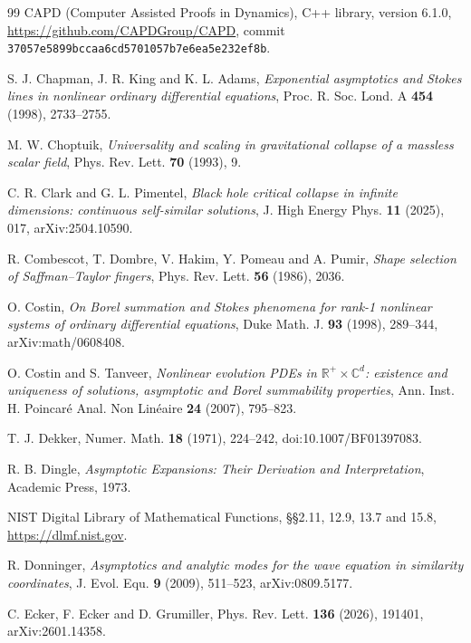 \documentclass{amsart}
\numberwithin{equation}{section}
\theoremstyle{plain}
\theoremstyle{definition}
\theoremstyle{remark}
\begin{document}
\begin{thebibliography}{99}
 CAPD (Computer Assisted Proofs in Dynamics), C++ library, version 6.1.0,
\url{https://github.com/CAPDGroup/CAPD}, commit \texttt{37057e5899bccaa6cd5701057b7e6ea5e232ef8b}.

 S. J. Chapman, J. R. King and K. L. Adams, \emph{Exponential asymptotics and Stokes
lines in nonlinear ordinary differential equations}, Proc. R. Soc. Lond. A \textbf{454} (1998), 2733--2755.

 M. W. Choptuik, \emph{Universality and scaling in gravitational collapse of a massless scalar
field}, Phys. Rev. Lett. \textbf{70} (1993), 9.

 C. R. Clark and G. L. Pimentel, \emph{Black hole critical collapse in infinite dimensions:
continuous self-similar solutions}, J. High Energy Phys. \textbf{11} (2025), 017, arXiv:2504.10590.

 R. Combescot, T. Dombre, V. Hakim, Y. Pomeau and A. Pumir, \emph{Shape selection of
Saffman--Taylor fingers}, Phys. Rev. Lett. \textbf{56} (1986), 2036.

 O. Costin, \emph{On Borel summation and Stokes phenomena for rank-1 nonlinear systems of ordinary
differential equations}, Duke Math. J. \textbf{93} (1998), 289--344, arXiv:math/0608408.

 O. Costin and S. Tanveer, \emph{Nonlinear evolution PDEs in $\mathbb R^+\times\mathbb C^d$:
existence and uniqueness of solutions, asymptotic and Borel summability properties}, Ann. Inst. H. Poincar\'e Anal.
Non Lin\'eaire \textbf{24} (2007), 795--823.

 T. J. Dekker, Numer. Math. \textbf{18} (1971), 224--242, doi:10.1007/BF01397083.

 R. B. Dingle, \emph{Asymptotic Expansions: Their Derivation and Interpretation}, Academic Press,
1973.

 NIST Digital Library of Mathematical Functions, \S\S2.11, 12.9, 13.7 and 15.8,
\url{https://dlmf.nist.gov}.

 R. Donninger, \emph{Asymptotics and analytic modes for the wave equation in similarity
coordinates}, J. Evol. Equ. \textbf{9} (2009), 511--523, arXiv:0809.5177.

 C. Ecker, F. Ecker and D. Grumiller, Phys. Rev. Lett. \textbf{136} (2026), 191401,
arXiv:2601.14358.


\end{thebibliography}
\end{document}

